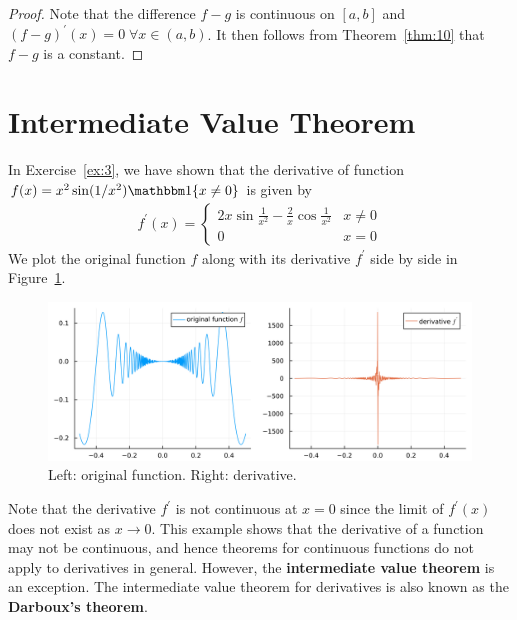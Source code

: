 \documentclass[thmcnt=section, 12pt]{my-elegantbook}
\begin{document}
\begin{proof}
    Note that the difference $f-g$ is continuous on $[a, b]$ and $(f-g)^\prime(x) = 0 \; \forall x \in (a, b)$. It then follows from Theorem~\ref{thm:10} that $f-g$ is a constant.
\end{proof}


\section{Intermediate Value Theorem}

\par In Exercise~\ref{ex:3}, we have shown that the derivative of function $f(x) = x^2 \sin(1/x^2) \ind\{x \neq 0\}$ is given by 
\begin{align*}
    f^\prime(x) = \begin{cases}
        2x \sin \frac{1}{x^2} 
        - \frac{2}{x} \cos \frac{1}{x^2}
        & x \neq 0 \\
        0 & x = 0
    \end{cases}
\end{align*}
We plot the original function $f$ along with its derivative $f^\prime$ side by side in Figure~\ref{fig:4}.
\begin{figure}[ht]
    \centering
    \includegraphics[scale=0.2]{figures/graph-004.png}
    \caption{Left: original function. Right: derivative.}
    \label{fig:4}
\end{figure}

\noindent Note that the derivative $f^\prime$ is not continuous at $x = 0$ since the limit of $f^\prime(x)$ does not exist as $x \to 0$. This example shows that the derivative of a function may not be continuous, and hence theorems for continuous functions do not apply to derivatives in general. However, the \textbf{intermediate value theorem} is an exception. The intermediate value theorem for derivatives is also known as the \textbf{Darboux's theorem}.
\end{document}
